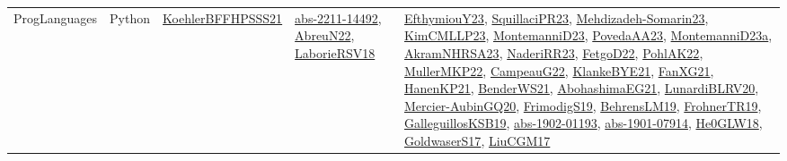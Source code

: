 {\begin{longtable}{lp{3cm}>{\raggedright}p{6cm}>{\raggedright}p{6cm}p{8cm}}
ProgLanguages & Python & \href{articles/KoehlerBFFHPSSS21.pdf}{KoehlerBFFHPSSS21}\cite{KoehlerBFFHPSSS21} & \href{articles/abs-2211-14492.pdf}{abs-2211-14492}\cite{abs-2211-14492}, \href{articles/AbreuN22.pdf}{AbreuN22}\cite{AbreuN22}, \href{articles/LaborieRSV18.pdf}{LaborieRSV18}\cite{LaborieRSV18} & \href{papers/EfthymiouY23.pdf}{EfthymiouY23}\cite{EfthymiouY23}, \href{papers/SquillaciPR23.pdf}{SquillaciPR23}\cite{SquillaciPR23}, \href{papers/Mehdizadeh-Somarin23.pdf}{Mehdizadeh-Somarin23}\cite{Mehdizadeh-Somarin23}, \href{papers/KimCMLLP23.pdf}{KimCMLLP23}\cite{KimCMLLP23}, \href{articles/MontemanniD23.pdf}{MontemanniD23}\cite{MontemanniD23}, \href{papers/PovedaAA23.pdf}{PovedaAA23}\cite{PovedaAA23}, \href{articles/MontemanniD23a.pdf}{MontemanniD23a}\cite{MontemanniD23a}, \href{articles/AkramNHRSA23.pdf}{AkramNHRSA23}\cite{AkramNHRSA23}, \href{articles/NaderiRR23.pdf}{NaderiRR23}\cite{NaderiRR23}, \href{articles/FetgoD22.pdf}{FetgoD22}\cite{FetgoD22}, \href{articles/PohlAK22.pdf}{PohlAK22}\cite{PohlAK22}, \href{articles/MullerMKP22.pdf}{MullerMKP22}\cite{MullerMKP22}, \href{articles/CampeauG22.pdf}{CampeauG22}\cite{CampeauG22}, \href{papers/KlankeBYE21.pdf}{KlankeBYE21}\cite{KlankeBYE21}, \href{articles/FanXG21.pdf}{FanXG21}\cite{FanXG21}, \href{papers/HanenKP21.pdf}{HanenKP21}\cite{HanenKP21}, \href{papers/BenderWS21.pdf}{BenderWS21}\cite{BenderWS21}, \href{articles/AbohashimaEG21.pdf}{AbohashimaEG21}\cite{AbohashimaEG21}, \href{articles/LunardiBLRV20.pdf}{LunardiBLRV20}\cite{LunardiBLRV20}, \href{papers/Mercier-AubinGQ20.pdf}{Mercier-AubinGQ20}\cite{Mercier-AubinGQ20}, \href{papers/FrimodigS19.pdf}{FrimodigS19}\cite{FrimodigS19}, \href{papers/BehrensLM19.pdf}{BehrensLM19}\cite{BehrensLM19}, \href{papers/FrohnerTR19.pdf}{FrohnerTR19}\cite{FrohnerTR19}, \href{papers/GalleguillosKSB19.pdf}{GalleguillosKSB19}\cite{GalleguillosKSB19}, \href{articles/abs-1902-01193.pdf}{abs-1902-01193}\cite{abs-1902-01193}, \href{articles/abs-1901-07914.pdf}{abs-1901-07914}\cite{abs-1901-07914}, \href{papers/He0GLW18.pdf}{He0GLW18}\cite{He0GLW18}, \href{papers/GoldwaserS17.pdf}{GoldwaserS17}\cite{GoldwaserS17}, \href{papers/LiuCGM17.pdf}{LiuCGM17}\cite{LiuCGM17}\\

\end{longtable}}
